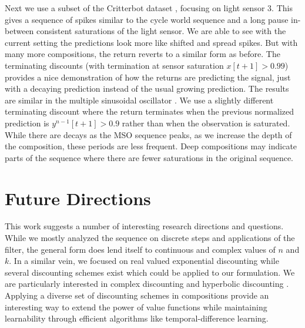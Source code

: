 \documentclass[11pt]{article} %
\begin{document}
Next we use a subset of the Critterbot dataset \parencite{modayil2014,
  white2015}, focusing on light sensor 3. This gives a
sequence of spikes similar to the cycle world sequence and a long
pause in-between consistent saturations of the light sensor. We are able to
see with the current setting the predictions look more like
shifted and spread spikes. But with many more compositions, the return
reverts to a similar form as before. The terminating discounts (with
termination at sensor saturation $x[t+1] > 0.99$) provides
a nice demonstration of how the returns are predicting the signal,
just with a decaying prediction instead of the usual growing prediction.
The results are similar in the multiple
sinusoidal oscillator \parencite{jaeger2004harnessing}.
We use a slightly different terminating discount where the return
terminates when the previous normalized prediction is $y^{n-1}[t+1] > 0.9$ rather
than when the observation is saturated. While there are decays as the
MSO sequence peaks, as we increase the depth of the composition, these
periods are less frequent. Deep
compositions may indicate parts of the sequence where there are fewer
saturations in the original sequence.

\section{Future Directions}


This work suggests a number of interesting research
directions and questions. While we mostly analyzed the sequence on
discrete steps and applications of the filter, the general form does
lend itself to continuous and complex values of $n$ and $k$. In a similar vein, we
focused on real valued exponential discounting while several
discounting schemes exist which could be applied to our
formulation. We are particularly interested in complex discounting
\parencite{de2018predicting} and hyperbolic discounting
\parencite{fedus2019hyperbolic}. Applying a diverse set of discounting
schemes in compositions provide an interesting way to extend the
power of value functions while maintaining learnability through
efficient algorithms like temporal-difference learning. 
\end{document}
